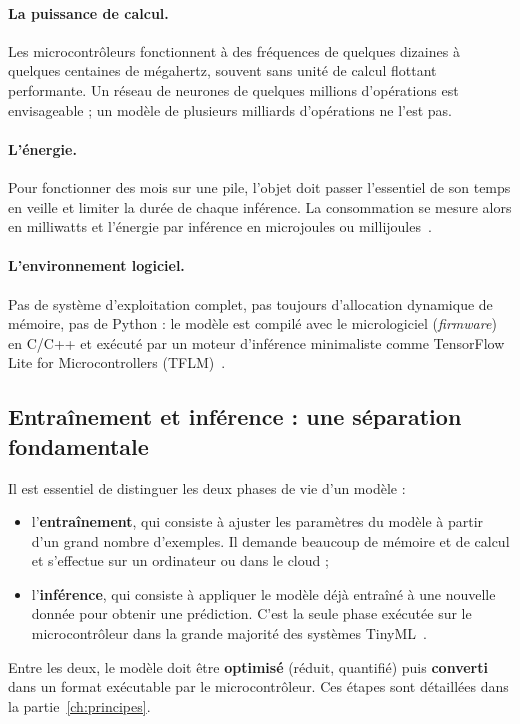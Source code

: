 \paragraph{La puissance de calcul.} Les microcontrôleurs fonctionnent à des
fréquences de quelques dizaines à quelques centaines de mégahertz, souvent sans
unité de calcul flottant performante. Un réseau de neurones de quelques
millions d'opérations est envisageable ; un modèle de plusieurs milliards
d'opérations ne l'est pas.

\paragraph{L'énergie.} Pour fonctionner des mois sur une pile, l'objet doit
passer l'essentiel de son temps en veille et limiter la durée de chaque
inférence. La consommation se mesure alors en milliwatts et l'énergie par
inférence en microjoules ou millijoules~\cite{banbury2021mlperftiny}.

\paragraph{L'environnement logiciel.} Pas de système d'exploitation complet,
pas toujours d'allocation dynamique de mémoire, pas de Python : le modèle est
compilé avec le micrologiciel (\emph{firmware}) en C/C++ et exécuté par un
moteur d'inférence minimaliste comme TensorFlow Lite for Microcontrollers
(TFLM)~\cite{david2021tflm}.

\subsection{Entraînement et inférence : une séparation fondamentale}

Il est essentiel de distinguer les deux phases de vie d'un modèle :
\begin{itemize}
  \item l'\textbf{entraînement}, qui consiste à ajuster les paramètres du modèle
        à partir d'un grand nombre d'exemples. Il demande beaucoup de mémoire
        et de calcul et s'effectue sur un ordinateur ou dans le cloud ;
  \item l'\textbf{inférence}, qui consiste à appliquer le modèle déjà entraîné à
        une nouvelle donnée pour obtenir une prédiction. C'est la seule phase
        exécutée sur le microcontrôleur dans la grande majorité des systèmes
        TinyML~\cite{david2021tflm}.
\end{itemize}
Entre les deux, le modèle doit être \textbf{optimisé} (réduit, quantifié) puis
\textbf{converti} dans un format exécutable par le microcontrôleur. Ces étapes
sont détaillées dans la partie~\ref{ch:principes}.

